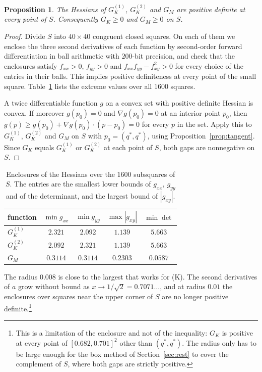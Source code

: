 \documentclass[aps,prd,twocolumn,superscriptaddress,nofootinbib,longbibliography,floatfix,amsmath,amssymb,10pt]{revtex4-2}
\theoremstyle{plain}
\newtheorem{proposition}[theorem]{Proposition}
\theoremstyle{definition}
\theoremstyle{plain}
\newcommand{\qs}{q^{*}}
\begin{document}
\begin{proposition}\label{prop:convex}
The Hessians of $G_K^{(1)}$, $G_K^{(2)}$ and $G_M$ are positive definite at every point of $S$. Consequently $G_K\ge 0$ and $G_M\ge 0$ on $S$.
\end{proposition}

\begin{proof}
Divide $S$ into $40\times 40$ congruent closed squares. On each of them we enclose the three second derivatives of each function by second-order forward differentiation in ball arithmetic with $200$-bit precision, and check that the enclosures satisfy $f_{xx}>0$, $f_{yy}>0$ and $f_{xx}f_{yy}-f_{xy}^2>0$ for every choice of the entries in their balls. This implies positive definiteness at every point of the small square. Table~\ref{tab:hessian} lists the extreme values over all $1600$ squares.

A twice differentiable function $g$ on a convex set with positive definite Hessian is convex. If moreover $g(p_0)=0$ and $\nabla g(p_0)=0$ at an interior point $p_0$, then $g(p)\ge g(p_0)+\nabla g(p_0)\cdot(p-p_0)=0$ for every $p$ in the set. Apply this to $G_K^{(1)}$, $G_K^{(2)}$ and $G_M$ on $S$ with $p_0=(\qs,\qs)$, using Proposition~\ref{prop:tangent}. Since $G_K$ equals $G_K^{(1)}$ or $G_K^{(2)}$ at each point of $S$, both gaps are nonnegative on $S$.
\end{proof}

\begin{table}[t]
\centering
\caption{Enclosures of the Hessians over the $1600$ subsquares of $S$. The entries are the smallest lower bounds of $g_{xx}$, $g_{yy}$ and of the determinant, and the largest bound of $|g_{xy}|$.}
\label{tab:hessian}
\begin{tabular}{lcccc}
\toprule
function & $\min g_{xx}$ & $\min g_{yy}$ & $\max|g_{xy}|$ & $\min\det$\\
\midrule
$G_K^{(1)}$ & $2.321$ & $2.092$ & $1.139$ & $5.663$\\
$G_K^{(2)}$ & $2.092$ & $2.321$ & $1.139$ & $5.663$\\
$G_M$ & $0.3114$ & $0.3114$ & $0.2303$ & $0.0587$\\
\bottomrule
\end{tabular}
\end{table}

The radius $0.008$ is close to the largest that works for (K). The second derivatives of $a$ grow without bound as $x\to 1/\sqrt2=0.7071\ldots$, and at radius $0.01$ the enclosures over squares near the upper corner of $S$ are no longer positive definite.\footnote{This is a limitation of the enclosure and not of the inequality: $G_K$ is positive at every point of $[0.682,0.701]^2$ other than $(\qs,\qs)$. The radius only has to be large enough for the box method of Section~\ref{sec:rest} to cover the complement of $S$, where both gaps are strictly positive.}
\end{document}
